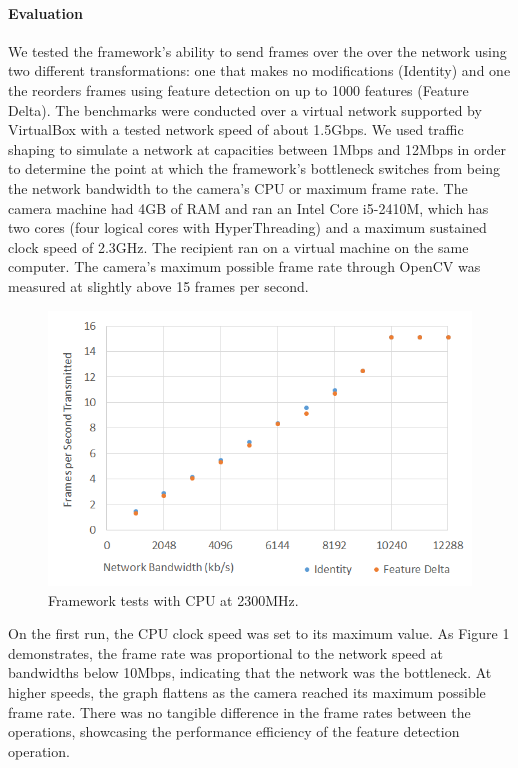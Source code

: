 \paragraph{Evaluation}

We tested the framework's ability to send frames over the over the network
using two different transformations: one that makes no modifications
(Identity) and one the reorders frames using feature detection on up to
1000 features (Feature Delta).  The benchmarks were conducted over a
virtual network supported by VirtualBox with a tested network speed of about 1.5Gbps.
We used traffic shaping to simulate a network at capacities between 1Mbps and 12Mbps in order to
determine the point at which the framework's bottleneck switches from being the
network bandwidth to the camera's CPU or maximum frame rate.  The camera machine had 4GB of RAM
and ran an Intel Core i5-2410M, which has two cores (four logical cores with HyperThreading)
and a maximum sustained clock speed of 2.3GHz.  The recipient
ran on a virtual machine on the same computer.  The camera's maximum possible
frame rate through OpenCV was measured at slightly above 15 frames per second.

\begin{figure}[h]
\includegraphics[width=\columnwidth]{figure3.png}
\caption{Framework tests with CPU at 2300MHz.}
\end{figure}

On the first run, the CPU clock speed was set to its maximum value. As Figure 1
demonstrates, the frame rate was proportional to the network speed at bandwidths
below 10Mbps, indicating that the network was the bottleneck.  At higher speeds,
the graph flattens as the camera reached its maximum possible frame rate.
There was no tangible difference in the frame rates between the operations,
showcasing the performance efficiency of the feature detection operation.

